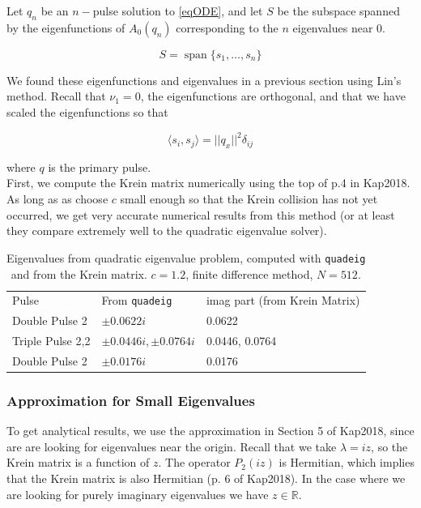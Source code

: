 \documentclass[12pt]{article}
\def\R{{\mathbb R}}
\DeclareMathOperator{\spn}{span}
\begin{document}
Let $q_n$ be an $n-$pulse solution to \eqref{eqODE}, and let $S$ be the subspace spanned by the eigenfunctions of $A_0(q_n)$ corresponding to the $n$ eigenvalues near 0.

\begin{equation}\label{defS}
S = \spn\{s_1, \dots, s_n \}
\end{equation}

We found these eigenfunctions and eigenvalues in a previous section using Lin's method. Recall that $\nu_1 = 0$, the eigenfunctions are orthogonal, and that we have scaled the eigenfunctions so that 

\begin{equation}
\langle s_i, s_j \rangle = ||q_x||^2 \delta_{ij}
\end{equation}

where $q$ is the primary pulse.\\

First, we compute the Krein matrix numerically using the top of p.4 in Kap2018. As long as as choose $c$ small enough so that the Krein collision has not yet occurred, we get very accurate numerical results from this method (or at least they compare extremely well to the quadratic eigenvalue solver). 

\begin{table}[H]
\begin{tabular}{lll}
Pulse & From \texttt{quadeig} & imag part (from Krein Matrix) \\
Double Pulse 2    & $\pm 0.0622i$ & 0.0622 \\
Triple Pulse 2,2  & $\pm 0.0446i, \pm 0.0764i$ & 0.0446, 0.0764 \\
Double Pulse 2    & $\pm 0.0176i$ & 0.0176 \\
\end{tabular}
\caption{Eigenvalues from quadratic eigenvalue problem, computed with \texttt{quadeig} and from the Krein matrix. $c = 1.2$, finite difference method, $N = 512$. }
\end{table}

\subsubsection{Approximation for Small Eigenvalues}

To get analytical results, we use the approximation in Section 5 of Kap2018, since are are looking for eigenvalues near the origin. Recall that we take $\lambda = i z$, so the Krein matrix is a function of $z$. The operator $P_2(iz)$ is Hermitian, which implies that the Krein matrix is also Hermitian (p. 6 of Kap2018). In the case where we are looking for purely imaginary eigenvalues we have $z \in \R$.\\
\end{document}
